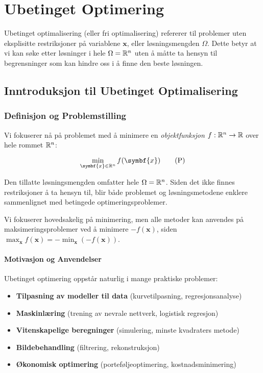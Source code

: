\part{Ubetinget Optimering}
\label{part:unconstrained_optimization}

Ubetinget optimalisering (eller fri optimalisering) refererer til problemer uten eksplisitte restriksjoner på variablene \(\symbf{x}\), eller løsningsmengden \(\Omega\).
Dette betyr at vi kan søke etter løsninger i hele \(\Omega = \mathbb{R}^n\) uten å måtte ta hensyn til begrensninger som kan hindre oss i å finne den beste løsningen.

\chapter{Inntroduksjon til Ubetinget Optimalisering}
\label{chap:unconstrained_optimization}

\section{Definisjon og Problemstilling}
Vi fokuserer nå på problemet med å minimere en \textit{objektfunksjon}
\( f : \mathbb{R}^n \to \mathbb{R} \) over hele rommet \(\mathbb{R}^n\):

\[
	\min_{\symbf{x} \in \R^n} f(\symbf{x}) \tag{P} \label{eq:global_minimization_problem}
\]

Den tillatte løsningsmengden omfatter hele \( \Omega = \mathbb{R}^n\).
Siden det ikke finnes restriksjoner å ta hensyn til, blir både problemet og løsningsmetodene enklere sammenlignet med betingede optimeringsproblemer.

Vi fokuserer hovedsakelig på minimering, men alle metoder kan anvendes på maksimeringsproblemer ved å minimere \(-f(\symbf{x})\), siden \(\max_{\symbf{x}} f(\symbf{x}) = -\min_{\symbf{x}} (-f(\symbf{x}))\).

\subsection{Motivasjon og Anvendelser}
Ubetinget optimering oppstår naturlig i mange praktiske problemer:

\begin{itemize}
	\item \textbf{Tilpasning av modeller til data} (kurvetilpasning, regresjonsanalyse)
	\item \textbf{Maskinlæring} (trening av nevrale nettverk, logistisk regresjon)
	\item \textbf{Vitenskapelige beregninger} (simulering, minste kvadraters metode)
	\item \textbf{Bildebehandling} (filtrering, rekonstruksjon)
	\item \textbf{Økonomisk optimering} (porteføljeoptimering, kostnadsminimering)
\end{itemize}

